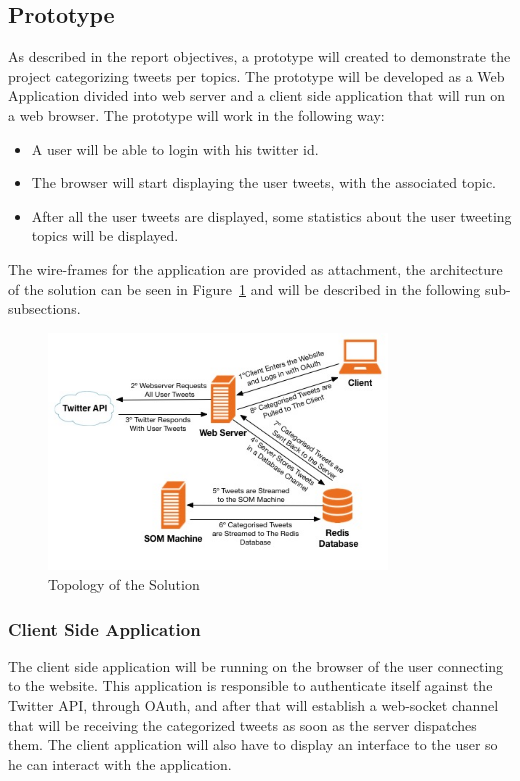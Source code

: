 \subsection{Prototype} %
\label{sub:web_site_creation}
As described in the report objectives, a prototype will created to demonstrate the project categorizing tweets per topics. The prototype will be developed as a Web Application divided into web server and a client side application that will run on a web browser. The prototype will work in the following way:
\begin{itemize}
  \item A user will be able to login with his twitter id.
  \item The browser will start displaying the user tweets, with the associated topic.
  \item After all the user tweets are displayed, some statistics about the user tweeting topics will be displayed.
\end{itemize}
The wire-frames for the application are provided as attachment, the architecture of the solution can be seen in Figure~\ref{fig:solution} and will be described in the following sub-subsections.
\begin{figure}[tb]
  \begin{center}
    \includegraphics[width=9cm]{images/12_network.jpg}
  \end{center}
  \caption{Topology of the Solution}
  \label{fig:solution}
\end{figure}

\subsubsection{Client Side Application} %
\label{ssub:client_side_application}
The client side application will be running on the browser of the user connecting to the website. This application is responsible to authenticate itself against the Twitter API, through OAuth, and after that will establish a web-socket channel that will be receiving the categorized tweets as soon as the server dispatches them. The client application will also have to display an interface to the user so he can interact with the application.

